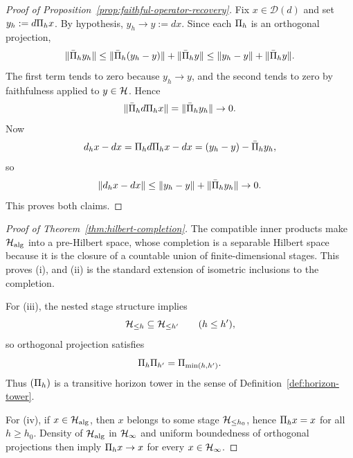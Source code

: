 \label{sec:appendix-continuum}


\begin{proof}[Proof of Proposition~\ref{prop:faithful-operator-recovery}]
\label{proof:prop:faithful-operator-recovery}
Fix $x\in\mathcal D(d)$ and set $y_h:=d\Pi_{h}x$. By hypothesis,
$y_h\to y:=dx$. Since each $\Pi_{h}$ is an orthogonal projection,
\[
\|\bar{\Pi}_{h}y_h\|
\le
\|\bar{\Pi}_{h}(y_h-y)\|+\|\bar{\Pi}_{h}y\|
\le
\|y_h-y\|+\|\bar{\Pi}_{h}y\|.
\]
The first term tends to zero because $y_h\to y$, and the second tends to zero
by faithfulness applied to $y\in\mathcal{H}$. Hence
\[
\|\bar{\Pi}_{h}d\Pi_{h}x\|=\|\bar{\Pi}_{h}y_h\|\to 0.
\]
Now
\[
d_{h}x-dx
=
\Pi_{h}d\Pi_{h}x-dx
=
(y_h-y)-\bar{\Pi}_{h}y_h,
\]
so
\[
\|d_{h}x-dx\|
\le
\|y_h-y\|+\|\bar{\Pi}_{h}y_h\|
\to 0.
\]
This proves both claims.
\end{proof}

\begin{proof}[Proof of Theorem~\ref{thm:hilbert-completion}]
\label{proof:thm:hilbert-completion}
The compatible inner products make $\mathcal{H}_{\mathrm{alg}}$ into a pre-Hilbert
space, whose completion is a separable Hilbert space because it is the closure
of a countable union of finite-dimensional stages. This proves (i), and (ii) is
the standard extension of isometric inclusions to the completion.

For (iii), the nested stage structure implies
\[
\mathcal{H}_{\le h}\subseteq \mathcal{H}_{\le h'}
\qquad(h\le h'),
\]
so orthogonal projection satisfies
\[
\Pi_{h}\Pi_{h'}=\Pi_{\min(h,h')}.
\]
Thus $(\Pi_{h})$ is a transitive horizon tower in the sense of
Definition~\ref{def:horizon-tower}.

For (iv), if $x\in\mathcal{H}_{\mathrm{alg}}$, then $x$ belongs to some stage
$\mathcal{H}_{\le h_0}$, hence $\Pi_{h}x=x$ for all $h\ge h_0$. Density of
$\mathcal{H}_{\mathrm{alg}}$ in $\mathcal{H}_\infty$ and uniform boundedness of orthogonal
projections then imply $\Pi_{h}x\to x$ for every $x\in\mathcal{H}_\infty$.
\end{proof}


